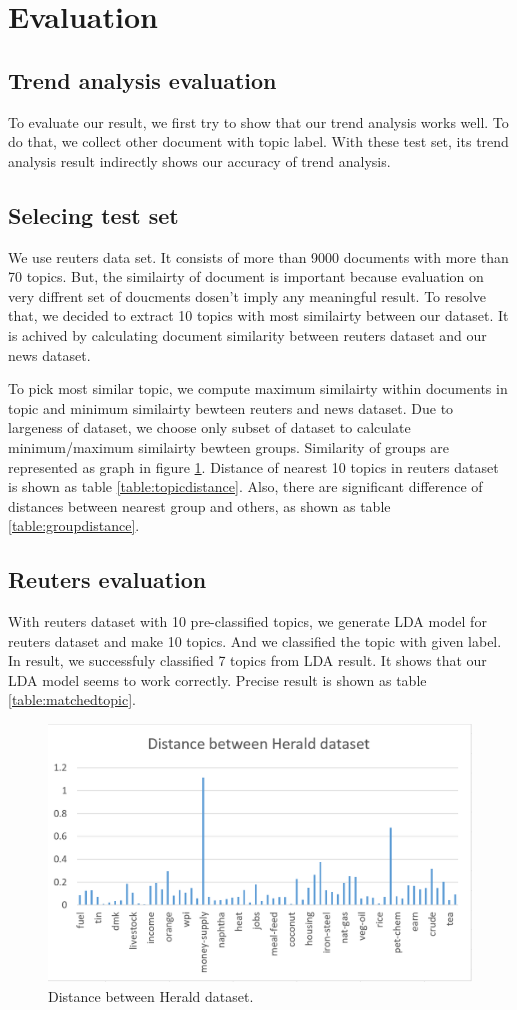 \section{Evaluation}

\subsection{Trend analysis evaluation}
To evaluate our result, we first try to show that our trend analysis
works well. To do that, we collect other document with topic label.
With these test set, its trend analysis result indirectly shows our
accuracy of trend analysis.
\subsection{Selecing test set}
We use reuters data set. It consists of more than 9000 documents
with more than 70 topics. But, the similairty of document is important
because evaluation on very diffrent set of doucments dosen't imply
any meaningful result. To resolve that, we decided to extract 10 topics
with most similairty between our dataset. It is achived by calculating
document similarity between reuters dataset and our news dataset.

To pick most similar topic, we compute maximum similairty within documents
in topic and minimum similairty bewteen reuters and news dataset. Due to
largeness of dataset, we choose only subset of dataset to calculate
minimum/maximum similairty bewteen groups. Similarity of groups are
represented as graph in figure \ref{fig:distance}. Distance of nearest
10 topics in reuters dataset is shown as table \ref{table:topicdistance}.
Also, there are significant difference of distances between nearest group and
others, as shown as table \ref{table:groupdistance}.

\subsection{Reuters evaluation}
With reuters dataset with 10 pre-classified topics, we generate LDA
model for reuters dataset and make 10 topics. And we classified the topic
with given label. In result, we successfuly classified 7 topics from
LDA result. It shows that our LDA model seems to work correctly. Precise
result is shown as table \ref{table:matchedtopic}.

\begin{figure}[!htbp]
  \centering
  \includegraphics[width=0.8\linewidth]{Distance1}
  \caption{Distance between Herald dataset.}
  \label{fig:distance}
\end{figure}

